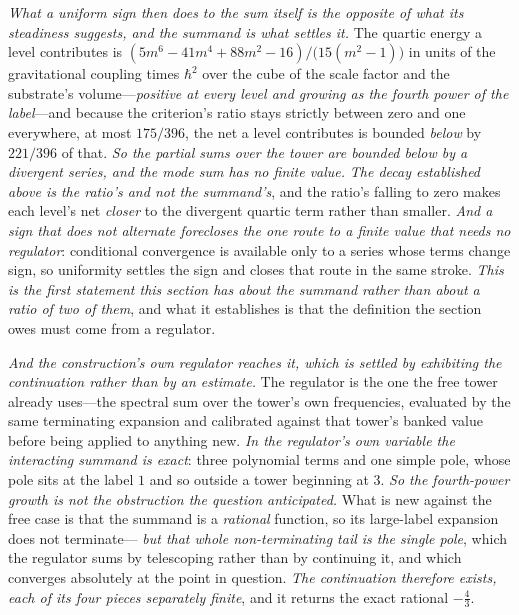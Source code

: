 \documentclass[11pt,a4paper]{article}
\theoremstyle{plain}
\theoremstyle{definition}
\theoremstyle{remark}
\begin{document}
\emph{What a uniform sign then does to the sum itself is the opposite of what its steadiness suggests, and the
summand is what settles it.} The quartic energy a level contributes is
$(5m^{6}-41m^{4}+88m^{2}-16)/\bigl(15(m^{2}-1)\bigr)$ in units of the gravitational coupling times
$\hbar^{2}$ over the cube of the scale factor and the substrate's volume---\emph{positive at every level and
growing as the fourth power of the label}---and because the criterion's ratio stays strictly between zero and one
everywhere, at most $175/396$, the net a level contributes is bounded \emph{below} by $221/396$ of that. \emph{So the partial sums over the tower
are bounded below by a divergent series, and the mode sum has no finite value.} \emph{The decay established above
is the ratio's and not the summand's}, and the ratio's falling to zero makes each level's net \emph{closer} to
the divergent quartic term rather than smaller. \emph{And a sign that does not alternate forecloses the one route
to a finite value that needs no regulator}: conditional convergence is available only to a series whose terms
change sign, so uniformity settles the sign and closes that route in the same stroke. \emph{This is the first
statement this section has about the summand rather than about a ratio of two of them}, and what it establishes
is that the definition the section owes must come from a regulator.

\emph{And the construction's own regulator reaches it, which is settled by exhibiting the continuation rather
than by an estimate.} The regulator is the one the free tower already uses---the spectral sum over the tower's own
frequencies, evaluated by the same terminating expansion and calibrated against that tower's banked value before
being applied to anything new. \emph{In the regulator's own variable the interacting summand is exact}: three
polynomial terms and one simple pole, whose pole sits at the label $1$ and so outside a tower beginning at $3$.
\emph{So the fourth-power growth is not the obstruction the question anticipated.} What is new against the free
case is that the summand is a \emph{rational} function, so its large-label expansion does not terminate---
\emph{but that whole non-terminating tail is the single pole}, which the regulator sums by telescoping rather than
by continuing it, and which converges absolutely at the point in question. \emph{The continuation therefore
exists, each of its four pieces separately finite}, and it returns the exact rational $-\tfrac43$.
\end{document}

